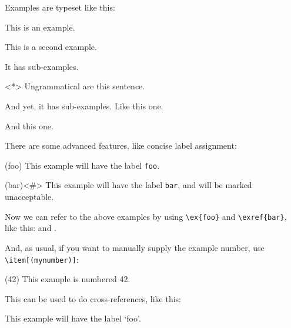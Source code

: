 \documentclass{article}
\begin{document}
%
\noindent Examples are typeset like this:
    \begin{examples}
        \item This is an example.
        \item This is a second example.
              \begin{examples}
                  \item It has sub-examples.
                  \item<*> Ungrammatical are this sentence.
                        \begin{examples}
                            \item And yet, it has sub-examples. Like this one.
                            \item And this one.
                        \end{examples}
              \end{examples}
    \end{examples}
There are some advanced features, like concise label assignment:
\begin{examples}
   \item \begin{examples}
        \item(foo) This example will have the label \verb|foo|.
        \item(bar)<\#> This example will have the label \verb|bar|, and will be marked 
                unacceptable.
    \end{examples} 
    
\end{examples}
%
Now we can refer to the above examples by using \verb|\ex{foo}| and \verb|\exref{bar}|, like this:  and .

And, as usual, if you want to manually supply the example number, use \verb|\item[(mynumber)]|:
\begin{examples}
    \item[(42)] This example is numbered 42.
\end{examples}

This can be used to do cross-references, like this:
\begin{examples}
    \item[\ex{foo}] This example will have the label `foo'.
\end{examples}
\end{document}
